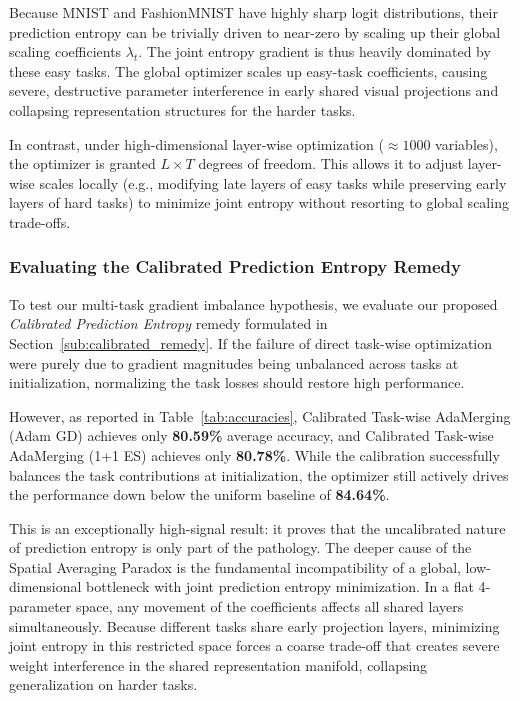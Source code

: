 Because MNIST and FashionMNIST have highly sharp logit distributions, their prediction entropy can be trivially driven to near-zero by scaling up their global scaling coefficients $\lambda_t$. The joint entropy gradient is thus heavily dominated by these easy tasks. The global optimizer scales up easy-task coefficients, causing severe, destructive parameter interference in early shared visual projections and collapsing representation structures for the harder tasks. 

In contrast, under high-dimensional layer-wise optimization ($\approx 1000$ variables), the optimizer is granted $L \times T$ degrees of freedom. This allows it to adjust layer-wise scales locally (e.g., modifying late layers of easy tasks while preserving early layers of hard tasks) to minimize joint entropy without resorting to global scaling trade-offs. 

\subsubsection{Evaluating the Calibrated Prediction Entropy Remedy}
\label{sub:calibrated_remedy_eval}
To test our multi-task gradient imbalance hypothesis, we evaluate our proposed \emph{Calibrated Prediction Entropy} remedy formulated in Section~\ref{sub:calibrated_remedy}. If the failure of direct task-wise optimization were purely due to gradient magnitudes being unbalanced across tasks at initialization, normalizing the task losses should restore high performance.

However, as reported in Table~\ref{tab:accuracies}, Calibrated Task-wise AdaMerging (Adam GD) achieves only \textbf{80.59\%} average accuracy, and Calibrated Task-wise AdaMerging (1+1 ES) achieves only \textbf{80.78\%}. While the calibration successfully balances the task contributions at initialization, the optimizer still actively drives the performance down below the uniform baseline of \textbf{84.64\%}.

This is an exceptionally high-signal result: it proves that the uncalibrated nature of prediction entropy is only part of the pathology. The deeper cause of the Spatial Averaging Paradox is the fundamental incompatibility of a global, low-dimensional bottleneck with joint prediction entropy minimization. In a flat 4-parameter space, any movement of the coefficients affects all shared layers simultaneously. Because different tasks share early projection layers, minimizing joint entropy in this restricted space forces a coarse trade-off that creates severe weight interference in the shared representation manifold, collapsing generalization on harder tasks.

